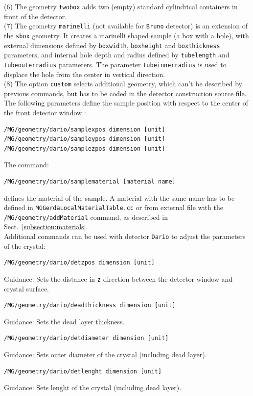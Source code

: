 (6) The geometry \texttt{twobox} adds two (empty) standard cylindrical containers in front of the detector.\\
(7) The geometry \texttt{marinelli} (not available for \texttt{Bruno} detector) is an extension of the \texttt{sbox} geometry. It creates a marinelli shaped sample (a box with a hole), with external dimensions defined by \texttt{boxwidth}, \texttt{boxheight} and \texttt{boxthickness} parameters, and internal hole depth and radius defined by \texttt{tubelength} and \texttt{tubeouterradius} parameters. The parameter \texttt{tubeinnerradius} is used to displace the hole from the center in vertical direction.\\
(8) The option \texttt{custom} selects additional geometry, which can't be described by previous commands, but has to be coded in the detector construction source file.\\
The following parameters define the sample position with respect to the center of the front 
detector window :
\begin{lstlisting}
/MG/geometry/dario/samplexpos dimension [unit]
/MG/geometry/dario/sampleypos dimension [unit]
/MG/geometry/dario/samplezpos dimension [unit]
\end{lstlisting}
The command:
\begin{lstlisting}
/MG/geometry/dario/samplematerial [material name]
\end{lstlisting}
defines the material of the sample. A material with the same name has to be defined in \texttt{MGGerdaLocalMaterialTable.cc} or from external file with the \texttt{/MG/geometry/addMaterial} command, as described in Sect.~\ref{subsection:materials}.\\
Additional commands can be used with detector \texttt{Dario} to adjust the parameters of the crystal:
\begin{lstlisting}
/MG/geometry/dario/detzpos dimension [unit]
\end{lstlisting}
Guidance: Sets the distance in \texttt{z} direction between the detector window and crystal surface.
\begin{lstlisting}
/MG/geometry/dario/deadthickness dimension [unit]
\end{lstlisting}
Guidance: Sets the dead layer thickness.
\begin{lstlisting}
/MG/geometry/dario/detdiameter dimension [unit]
\end{lstlisting}
Guidance: Sets outer diameter of the crystal (including dead layer).
\begin{lstlisting}
/MG/geometry/dario/detlenght dimension [unit]
\end{lstlisting}
Guidance: Sets lenght of the crystal (including dead layer).

